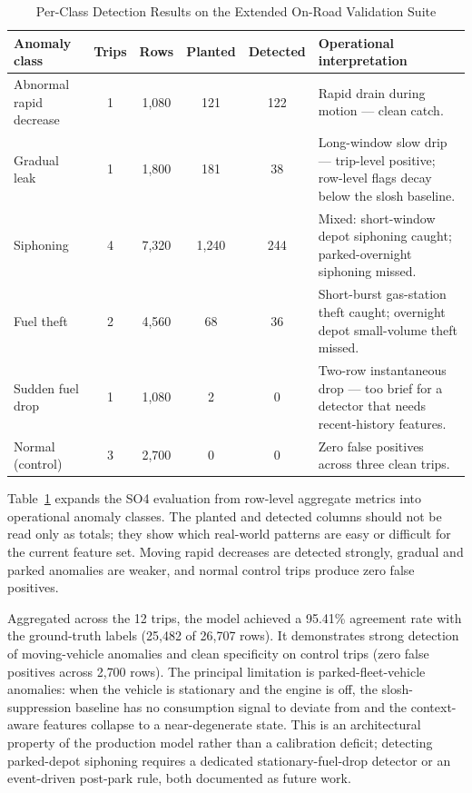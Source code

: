 \begin{table}[!htbp]
\centering
\caption{Per-Class Detection Results on the Extended On-Road Validation Suite}
\label{tab:so4_perclass}
\scriptsize
\setlength{\tabcolsep}{3pt}
\begin{tabular}{|p{}|c|c|c|c|p{}|}
\hline
\textbf{Anomaly class} & \textbf{Trips} & \textbf{Rows} & \textbf{Planted} & \textbf{Detected} & \textbf{Operational interpretation} \\
\hline
Abnormal rapid decrease & 1 & 1{,}080 & 121 & 122 & Rapid drain during motion --- clean catch. \\
\hline
Gradual leak & 1 & 1{,}800 & 181 & 38 & Long-window slow drip --- trip-level positive; row-level flags decay below the slosh baseline. \\
\hline
Siphoning & 4 & 7{,}320 & 1{,}240 & 244 & Mixed: short-window depot siphoning caught; parked-overnight siphoning missed. \\
\hline
Fuel theft & 2 & 4{,}560 & 68 & 36 & Short-burst gas-station theft caught; overnight depot small-volume theft missed. \\
\hline
Sudden fuel drop & 1 & 1{,}080 & 2 & 0 & Two-row instantaneous drop --- too brief for a detector that needs recent-history features. \\
\hline
Normal (control) & 3 & 2{,}700 & 0 & 0 & Zero false positives across three clean trips. \\
\hline
\end{tabular}
\normalsize
\end{table}

Table~\ref{tab:so4_perclass} expands the SO4 evaluation from row-level aggregate metrics into operational anomaly classes. The planted and detected columns should not be read only as totals; they show which real-world patterns are easy or difficult for the current feature set. Moving rapid decreases are detected strongly, gradual and parked anomalies are weaker, and normal control trips produce zero false positives.

Aggregated across the 12 trips, the model achieved a 95.41\% agreement rate with the ground-truth labels (25{,}482 of 26{,}707 rows). It demonstrates strong detection of moving-vehicle anomalies and clean specificity on control trips (zero false positives across 2{,}700 rows). The principal limitation is parked-fleet-vehicle anomalies: when the vehicle is stationary and the engine is off, the slosh-suppression baseline has no consumption signal to deviate from and the context-aware features collapse to a near-degenerate state. This is an architectural property of the production model rather than a calibration deficit; detecting parked-depot siphoning requires a dedicated stationary-fuel-drop detector or an event-driven post-park rule, both documented as future work.

